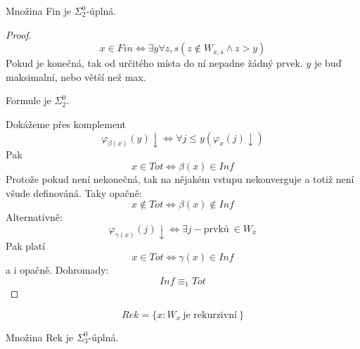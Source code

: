 \begin{theorem}
	Množina Fin je $\Sigma_2^0$-úplná.
\end{theorem}
\begin{proof}
	\[ x \in Fin \iff \exists y \forall z, s (z \notin W_{x, s} \land z > y) \]
	Pokud je konečná, tak od určitého místa do ní nepadne žádný prvek.
	$y$ je buď maksimalní, nebo větší než max.

	Formule je $\Sigma_2^0$.

	Dokážeme přes komplement
	\[ \varphi_{\beta(x)}(y) \downarrow \iff \forall j \leq y (\varphi_x(j) \downarrow) \]
	Pak
	\[ x \in Tot \iff \beta(x) \in Inf \]
	Protože pokud není nekonečná, tak na nějakém vstupu nekonverguje a totiž není všude definováná.
	Taky opačně:
	\[ x \notin Tot \iff \beta(x) \notin Inf \]
	Alternativně:
	\[ \varphi_{\gamma(x)} (j) \downarrow \iff \exists j-\text{prvků}\ \in W_x \]
	Pak platí
	\[ x \in Tot \iff \gamma(x) \in Inf \]
	a i opačně.
	Dohromady:
	\[ Inf \equiv_1 Tot \]
\end{proof}

\begin{definition}[Rek]
	\[ Rek = \{ x: W_x\ \text{je rekurzivní}\ \} \]
\end{definition}

\begin{theorem}
	Množina Rek je $\Sigma_3^0$-úplná.
\end{theorem}
